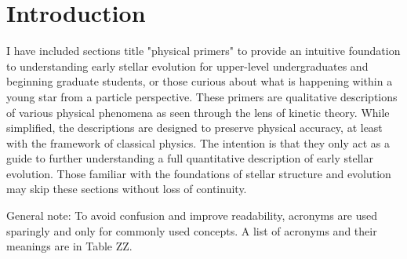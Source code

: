 \section{Introduction}
I have included sections title "physical primers" to provide an intuitive foundation to understanding early stellar evolution for upper-level undergraduates and beginning graduate students, or those curious about what is happening within a young star from a particle perspective. These primers are qualitative descriptions of various physical phenomena as seen through the lens of kinetic theory. While simplified, the descriptions are designed to preserve physical accuracy, at least with the framework of classical physics. The intention is that they only act as a guide to further understanding a full quantitative description of early stellar evolution. Those familiar with the foundations of stellar structure and evolution may skip these sections without loss of continuity.

General note: To avoid confusion and improve readability, acronyms are used sparingly and only for commonly used concepts. A list of acronyms and their meanings are in Table ZZ.
